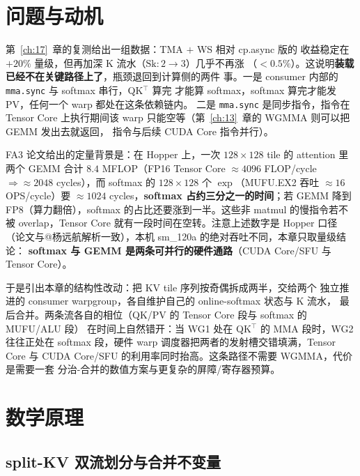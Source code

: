 \section{问题与动机}

第~\ref{ch:17}~章的复测给出一组数据：TMA $+$ WS 相对 cp.async 版的
收益稳定在 $+20\%$ 量级，但再加深 K 流水（$\mathrm{Sk}: 2 \to 3$）几乎不再涨
（$<0.5\%$）。这说明\textbf{装载已经不在关键路径上了}，瓶颈退回到计算侧的两件
事。一是 consumer 内部的 \texttt{mma.sync} 与 softmax 串行，QK$^\top$ 算完
才能算 softmax，softmax 算完才能发 PV，任何一个 warp 都处在这条依赖链内。
二是 \texttt{mma.sync} 是同步指令，指令在 Tensor Core 上执行期间该
warp 只能空等（第~\ref{ch:13}~章的 WGMMA 则可以把 GEMM 发出去就返回，
指令与后续 CUDA Core 指令并行）。

FA3 论文给出的定量背景是：在 Hopper 上，一次 $128 \times 128$ tile 的
attention 里两个 GEMM 合计 $8.4$ MFLOP（FP16 Tensor Core
$\approx 4096$ FLOP/cycle $\Rightarrow \approx 2048$ cycles），而 softmax 的
$128 \times 128$ 个 $\exp$（MUFU.EX2 吞吐 $\approx 16$ OPS/cycle）要
$\approx 1024$ cycles，\textbf{softmax 占约三分之一的时间}；若 GEMM 降到
FP8（算力翻倍），softmax 的占比还要涨到一半。这些非 matmul 的慢指令若不被
overlap，Tensor Core 就有一段时间在空转。注意上述数字是 Hopper 口径
（论文与@杨远航解析一致），本机 sm\_120a 的绝对吞吐不同，本章只取量级结论：
\textbf{softmax 与 GEMM 是两条可并行的硬件通路}（CUDA Core/SFU 与 Tensor Core）。

于是引出本章的结构性改动：把 KV tile 序列按奇偶拆成两半，交给两个
独立推进的 consumer warpgroup，各自维护自己的 online-softmax 状态与 K 流水，
最后合并。两条流各自的相位（QK/PV 的 Tensor Core 段与 softmax 的 MUFU/ALU 段）
在时间上自然错开：当 WG1 处在 QK$^\top$ 的 MMA 段时，WG2 往往正处在
softmax 段，硬件 warp 调度器把两者的发射槽交错填满，Tensor Core 与
CUDA Core/SFU 的利用率同时抬高。这条路径不需要 WGMMA，代价是需要一套
分治-合并的数值方案与更复杂的屏障/寄存器预算。

\section{数学原理}

\subsection{split-KV 双流划分与合并不变量}

